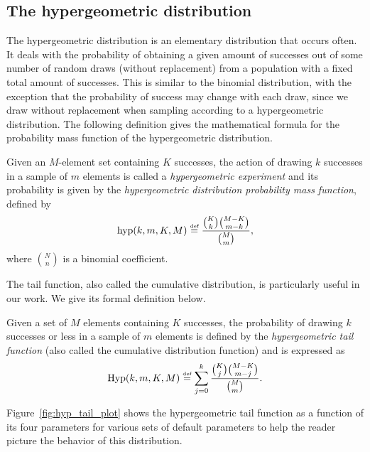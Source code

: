 \documentclass[twoside,11pt]{article}
\newcommand{\eqdef}{\overset{\smash{\mbox{\tiny \rm def}}}{=}}
\newcommand{\hyp}{\textnormal{hyp}}
\newcommand{\Hyp}{\textnormal{Hyp}}
\begin{document}
\subsection{The hypergeometric distribution}
\label{app:hyp_tail}

The hypergeometric distribution is an elementary distribution that occurs often.
It deals with the probability of obtaining a given amount of successes out of some number of random draws (without replacement) from a population with a fixed total amount of successes.
This is similar to the binomial distribution, with the exception that the probability of success may change with each draw, since we draw without replacement when sampling according to a hypergeometric distribution.
The following definition gives the mathematical formula for the probability mass function of the hypergeometric distribution.

\begin{definition}
Given an $M$-element set containing $K$ successes, the action of drawing $k$ successes in a sample of $m$ elements is called a \emph{hypergeometric experiment} and its probability is given by the \emph{hypergeometric distribution probability mass function}, defined by
\begin{equation*}
    \hyp(k,m,K,M) \eqdef \frac{\binom{K}{k}\binom{M-K}{m-k}}{\binom{M}{m}},
\end{equation*}
where $\binom{N}{n}$ is a binomial coefficient.
\end{definition}

The tail function, also called the cumulative distribution, is particularly useful in our work.
We give its formal definition below.

\begin{definition}
\label{def:app_hyp_tail}
Given a set of $M$ elements containing $K$ successes, the probability of drawing $k$ successes or less in a sample of $m$ elements is defined by the \emph{hypergeometric tail function} (also called the cumulative distribution function) and is expressed as
\begin{equation*}
    \Hyp(k,m,K,M) \eqdef \sum_{j=0}^k\frac{\binom{K}{j}\binom{M-K}{m-j}}{\binom{M}{m}}.
\end{equation*}
\end{definition}

Figure~\ref{fig:hyp_tail_plot} shows the hypergeometric tail function as a function of its four parameters for various sets of default parameters to help the reader picture the behavior of this distribution.
\end{document}
